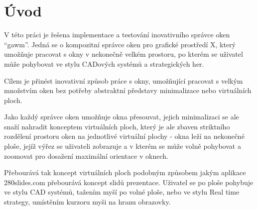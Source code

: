 \documentclass[12pt,a4paper,titlepage,final]{article}
\begin{document}



\pagestyle{plain}
\setcounter{page}{1}
\tableofcontents

\newpage
\pagestyle{plain}
\setcounter{page}{1}


\section{Úvod} \label{uvod}

V této práci je řešena implementace a testování inovativního správce oken ``gawm''.
Jedná se o kompozitní správce oken pro grafické prostředí X, který umožňuje pracovat s okny v nekonečně velkém prostoru, po kterém se uživatel může pohybovat ve stylu CADových systémů a strategických her.

Cílem je přinést inovativní způsob práce s okny, umožňující pracovat s velkým množstvím oken bez potřeby abstraktní představy minimalizace nebo virtuálních ploch.

Jako každý správce oken umožňuje okna přesouvat, jejich minimalizaci se ale snaží nahradit konceptem virtuálních ploch, který je ale zbaven striktního rozdělení prostoru oken na jednotlivé virtuální plochy - okna leží na nekonečné ploše, jejíž výřez se uživateli zobrazuje a v kterém se může volně pohybovat a zoomovat pro dosažení maximální orientace v oknech.

Přebourává tak koncept virtuálních ploch podobným způsobem jakým aplikace 280slides.com přebourává koncept slidů prezentace.
Uživatel se po ploše pohybuje ve stylu CAD systémů, tažením myší po volné ploše, nebo ve stylu Real time strategy, umístěním kurzoru myši na hranu obrazovky.
\end{document}
